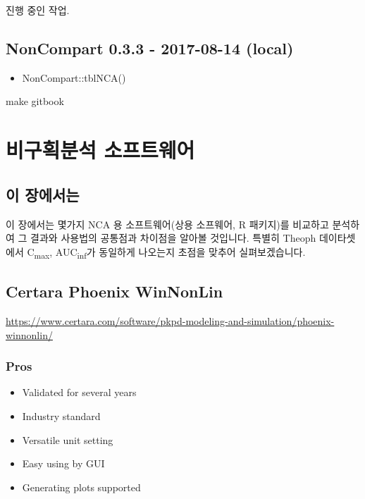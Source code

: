 \documentclass[]{krantz}
\makeatletter
\newenvironment{Shaded}{\begin{snugshade}}{\end{snugshade}}
\newcommand{\NormalTok}[1]{#1}
\providecommand{\tightlist}{%
  \setlength{\itemsep}{0pt}\setlength{\parskip}{0pt}}
\newenvironment{kframe}{%
\medskip{}
\setlength{\fboxsep}{.8em}
 \def\at@end@of@kframe{}%
 \ifinner\ifhmode%
  \def\at@end@of@kframe{\end{minipage}}%
  \begin{minipage}{\columnwidth}%
 \fi\fi%
 \def\FrameCommand##1{\hskip\@totalleftmargin \hskip-\fboxsep
 \colorbox{shadecolor}{##1}\hskip-\fboxsep
     \hskip-\linewidth \hskip-\@totalleftmargin \hskip\columnwidth}%
 \MakeFramed {\advance\hsize-\width
   \@totalleftmargin\z@ \linewidth\hsize
   \@setminipage}}%
 {\par\unskip\endMakeFramed%
 \at@end@of@kframe}
\renewenvironment{Shaded}{\begin{kframe}}{\end{kframe}}
\theoremstyle{definition}
\theoremstyle{definition}
\theoremstyle{definition}
\theoremstyle{remark}
\makeatother
\begin{document}
진행 중인 작업.

\subsection{NonCompart 0.3.3 - 2017-08-14
(local)}\label{noncompart-0.3.3---2017-08-14-local}

\begin{itemize}
\tightlist
\item
  NonCompart::tblNCA()
\end{itemize}

\begin{Shaded}
\begin{Highlighting}[]
\NormalTok{make gitbook}
\end{Highlighting}
\end{Shaded}

\appendix


\section{비구획분석 소프트웨어}\label{softwares}

\subsection{이 장에서는}\label{detailschapter}

이 장에서는 몇가지 NCA 용 소프트웨어(상용 소프웨어, R 패키지)를 비교하고
분석하여 그 결과와 사용법의 공통점과 차이점을 알아볼 것입니다. 특별히
Theoph 데이타셋에서 C\textsubscript{max}, AUC\textsubscript{inf}가
동일하게 나오는지 초점을 맞추어 실펴보겠습니다.

\subsection{Certara Phoenix WinNonLin}\label{certara-phoenix-winnonlin}

\url{https://www.certara.com/software/pkpd-modeling-and-simulation/phoenix-winnonlin/}

\subsubsection{Pros}\label{pros}

\begin{itemize}
\tightlist
\item
  Validated for several years
\item
  Industry standard
\item
  Versatile unit setting
\item
  Easy using by GUI
\item
  Generating plots supported
\end{itemize}
\end{document}
